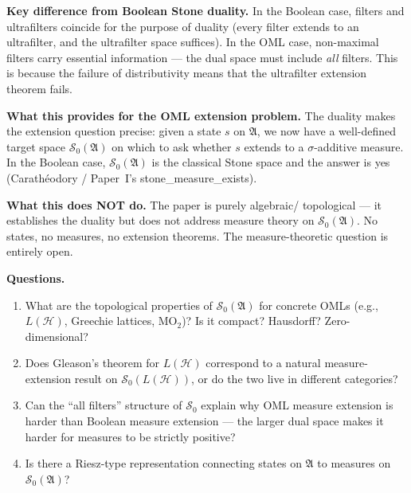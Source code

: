 \textbf{Key difference from Boolean Stone duality.}  In the Boolean
case, filters and ultrafilters coincide for the purpose of duality
(every filter extends to an ultrafilter, and the ultrafilter space
suffices).  In the OML case, non-maximal filters carry essential
information --- the dual space must include \emph{all} filters.  This
is because the failure of distributivity means that the ultrafilter
extension theorem fails.

\textbf{What this provides for the OML extension problem.}  The duality
makes the extension question precise: given a state $s$ on
$\mathfrak{A}$, we now have a well-defined target space
$\mathcal{S}_0(\mathfrak{A})$ on which to ask whether $s$ extends to a
$\sigma$-additive measure.  In the Boolean case,
$\mathcal{S}_0(\mathfrak{A})$ is the classical Stone space and the
answer is yes (Carath\'{e}odory / Paper~I's stone\_measure\_exists).

\textbf{What this does NOT do.}  The paper is purely algebraic/
topological --- it establishes the duality but does not address measure
theory on $\mathcal{S}_0(\mathfrak{A})$.  No states, no measures, no
extension theorems.  The measure-theoretic question is entirely open.

\textbf{Questions.}

\begin{enumerate}[nosep]
  \item What are the topological properties of
    $\mathcal{S}_0(\mathfrak{A})$ for concrete OMLs (e.g.,
    $L(\mathcal{H})$, Greechie lattices, MO$_2$)?  Is it compact?
    Hausdorff?  Zero-dimensional?
  \item Does Gleason's theorem for $L(\mathcal{H})$ correspond to a
    natural measure-extension result on $\mathcal{S}_0(L(\mathcal{H}))$,
    or do the two live in different categories?
  \item Can the ``all filters'' structure of $\mathcal{S}_0$ explain why
    OML measure extension is harder than Boolean measure extension ---
    the larger dual space makes it harder for measures to be strictly
    positive?
  \item Is there a Riesz-type representation connecting states on
    $\mathfrak{A}$ to measures on $\mathcal{S}_0(\mathfrak{A})$?
\end{enumerate}


